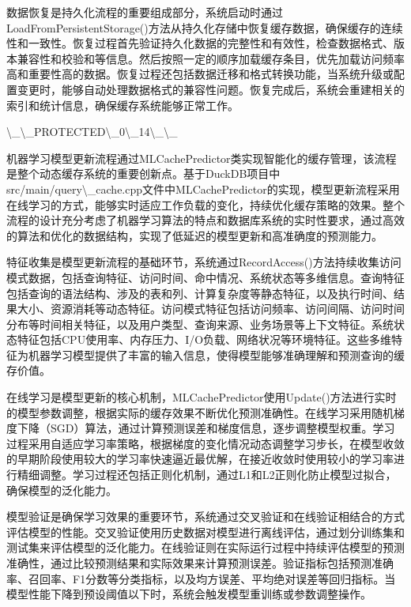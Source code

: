 数据恢复是持久化流程的重要组成部分，系统启动时通过LoadFromPersistentStorage()方法从持久化存储中恢复缓存数据，确保缓存的连续性和一致性。恢复过程首先验证持久化数据的完整性和有效性，检查数据格式、版本兼容性和校验和等信息。然后按照一定的顺序加载缓存条目，优先加载访问频率高和重要性高的数据。恢复过程还包括数据迁移和格式转换功能，当系统升级或配置变更时，能够自动处理数据格式的兼容性问题。恢复完成后，系统会重建相关的索引和统计信息，确保缓存系统能够正常工作。

\textbackslash{}_\textbackslash{}_PROTECTED\textbackslash{}_0\textbackslash{}_14\textbackslash{}_\textbackslash{}_

机器学习模型更新流程通过MLCachePredictor类实现智能化的缓存管理，该流程是整个动态缓存系统的重要创新点。基于DuckDB项目中src/main/query\textbackslash{}_cache.cpp文件中MLCachePredictor的实现，模型更新流程采用在线学习的方式，能够实时适应工作负载的变化，持续优化缓存策略的效果。整个流程的设计充分考虑了机器学习算法的特点和数据库系统的实时性要求，通过高效的算法和优化的数据结构，实现了低延迟的模型更新和高准确度的预测能力。

特征收集是模型更新流程的基础环节，系统通过RecordAccess()方法持续收集访问模式数据，包括查询特征、访问时间、命中情况、系统状态等多维信息。查询特征包括查询的语法结构、涉及的表和列、计算复杂度等静态特征，以及执行时间、结果大小、资源消耗等动态特征。访问模式特征包括访问频率、访问间隔、访问时间分布等时间相关特征，以及用户类型、查询来源、业务场景等上下文特征。系统状态特征包括CPU使用率、内存压力、I/O负载、网络状况等环境特征。这些多维特征为机器学习模型提供了丰富的输入信息，使得模型能够准确理解和预测查询的缓存价值。

在线学习是模型更新的核心机制，MLCachePredictor使用Update()方法进行实时的模型参数调整，根据实际的缓存效果不断优化预测准确性。在线学习采用随机梯度下降（SGD）算法，通过计算预测误差和梯度信息，逐步调整模型权重。学习过程采用自适应学习率策略，根据梯度的变化情况动态调整学习步长，在模型收敛的早期阶段使用较大的学习率快速逼近最优解，在接近收敛时使用较小的学习率进行精细调整。学习过程还包括正则化机制，通过L1和L2正则化防止模型过拟合，确保模型的泛化能力。

模型验证是确保学习效果的重要环节，系统通过交叉验证和在线验证相结合的方式评估模型的性能。交叉验证使用历史数据对模型进行离线评估，通过划分训练集和测试集来评估模型的泛化能力。在线验证则在实际运行过程中持续评估模型的预测准确性，通过比较预测结果和实际效果来计算预测误差。验证指标包括预测准确率、召回率、F1分数等分类指标，以及均方误差、平均绝对误差等回归指标。当模型性能下降到预设阈值以下时，系统会触发模型重训练或参数调整操作。

